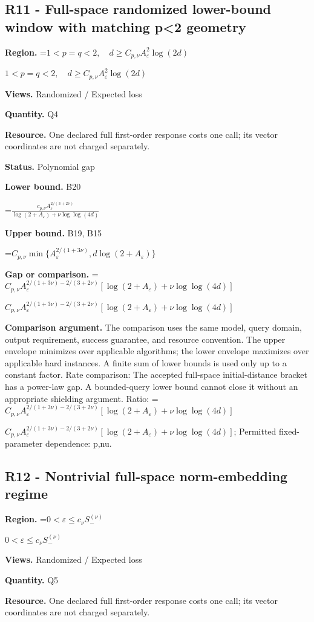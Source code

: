 \documentclass[10pt,a4paper]{article}
\newcommand{\AtlasMath}[1]{\par\begingroup\centering\setbox0=\hbox{$\displaystyle #1$}\ifdim\wd0>1.4\linewidth\typeout{ATLAS WIDE FORMULA: \the\wd0}\fi\ifdim\wd0>\linewidth\resizebox{\linewidth}{!}{\box0}\else\box0\fi\par\endgroup}
\newcommand{\AtlasInlineMath}[1]{\begingroup\setbox0=\hbox{$#1$}\ifdim\wd0>.4\linewidth\endgroup\AtlasMath{#1}\else\endgroup$#1$\fi}
\begin{document}
\subsection{R11 - Full-space randomized lower-bound window with matching p<2 geometry}
\textbf{Region.} \AtlasInlineMath{1<p=q<2,\quad d\ge C_{p,\nu} A_\varepsilon^2\log(2d)}

\textbf{Views.} Randomized / Expected loss

\textbf{Quantity.} Q4

\textbf{Resource.} One declared full first-order response costs one call; its vector coordinates are not charged separately.

\textbf{Status.} Polynomial gap

\textbf{Lower bound.} B20

\AtlasMath{\frac{c_{p,\nu} A_\varepsilon^{2/(3+2\nu)}}{\log(2+A_\varepsilon)+\nu\log\log(4d)}}
\textbf{Upper bound.} B19, B15

\AtlasMath{C_{p,\nu}\min\{A_\varepsilon^{2/(1+3\nu)},d\log(2+A_\varepsilon)\}}
\textbf{Gap or comparison.} \AtlasInlineMath{C_{p,\nu}A_\varepsilon^{2/(1+3\nu)-2/(3+2\nu)}[\log(2+A_\varepsilon)+\nu\log\log(4d)]}

\textbf{Comparison argument.} The comparison uses the same model, query domain, output requirement, success guarantee, and resource convention. The upper envelope minimizes over applicable algorithms; the lower envelope maximizes over applicable hard instances. A finite sum of lower bounds is used only up to a constant factor. Rate comparison: The accepted full-space initial-distance bracket has a power-law gap. A bounded-query lower bound cannot close it without an appropriate shielding argument. Ratio: \AtlasInlineMath{C_{p,\nu}A_\varepsilon^{2/(1+3\nu)-2/(3+2\nu)}[\log(2+A_\varepsilon)+\nu\log\log(4d)]}; Permitted fixed-parameter dependence: p,nu.

\subsection{R12 - Nontrivial full-space norm-embedding regime}
\textbf{Region.} \AtlasInlineMath{0<\varepsilon\le c_\nu S_-^{(\nu)}}

\textbf{Views.} Randomized / Expected loss

\textbf{Quantity.} Q5

\textbf{Resource.} One declared full first-order response costs one call; its vector coordinates are not charged separately.
\end{document}
